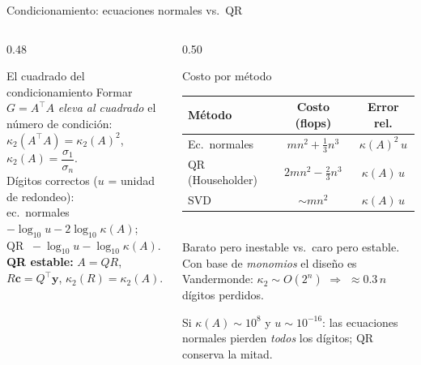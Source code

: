 \documentclass[aspectratio=169,10pt]{beamer}
\begin{document}
\begin{frame}{Condicionamiento: ecuaciones normales vs.\ QR}
\begin{columns}[T]
\begin{column}{0.48\textwidth}
\begin{cardidea}{El cuadrado del condicionamiento}{\faSuperscript}
{\footnotesize Formar $G=A^{\!\top}\!A$ \emph{eleva al cuadrado} el número de condición:\\[0.6mm]
$\kappa_2(A^{\!\top}\!A)=\kappa_2(A)^2$, \; $\kappa_2(A)=\dfrac{\sigma_1}{\sigma_n}$.\\[1.2mm]
Dígitos correctos ($u$ = unidad de redondeo):\\[0.4mm]
ec.\ normales $-\log_{10}u-2\log_{10}\kappa(A)$;\\[0.2mm]
QR $\ -\log_{10}u-\log_{10}\kappa(A)$.\\[1.2mm]
\textbf{QR estable:} $A=QR$, $R\mathbf c=Q^{\!\top}\mathbf y$, $\kappa_2(R)=\kappa_2(A)$.}
\end{cardidea}
\end{column}
\begin{column}{0.50\textwidth}
\begin{cardgear}{Costo por método}{\faTable}
\centering
{\footnotesize\renewcommand{\arraystretch}{1.22}\setlength{\tabcolsep}{6pt}
\begin{tabular}{l|cc}
Método & Costo (flops) & Error rel.\\\hline
Ec.\ normales & $mn^2+\tfrac13 n^3$ & $\kappa(A)^2\,u$\\
QR (Householder) & $2mn^2-\tfrac23 n^3$ & $\kappa(A)\,u$\\
SVD & $\sim mn^2$ & $\kappa(A)\,u$\\
\end{tabular}}\\[1.4mm]
{\footnotesize Barato pero inestable vs.\ caro pero estable. Con base de \emph{monomios} el diseño es Vandermonde: $\kappa_2\sim O(2^n)$ $\Rightarrow$ $\approx0.3\,n$ dígitos perdidos.}
\end{cardgear}
\vspace{1mm}
\begin{cardnota}[\faInfoCircle]
{\footnotesize Si $\kappa(A)\sim10^8$ y $u\sim10^{-16}$: las ecuaciones normales pierden \emph{todos} los dígitos; QR conserva la mitad.}
\end{cardnota}
\end{column}
\end{columns}
\end{frame}
\end{document}
